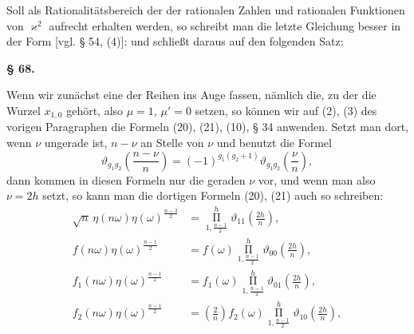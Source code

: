 
Soll als Rationalitätsbereich der der rationalen Zahlen und rationalen Funktionen von $\varkappa^2$ aufrecht erhalten werden, so schreibt man die letzte Gleichung besser in der Form [vgl. § 54, (4)]:
und schließt daraus auf den folgenden Satz:


\begin{center}
\textbf{§ 68.} \textbf{}
\end{center}

Wenn wir zunächst eine der Reihen ins Auge fassen, nämlich die, zu der die Wurzel $x_{1,0}$ gehört, also $\mu = 1$, $\mu' = 0$ setzen, so können wir auf (2), (3) des vorigen Paragraphen die Formeln (20), (21), (10), § 34 anwenden. Setzt man dort, wenn $\nu$ ungerade ist, $n - \nu$ an Stelle von $\nu$ und benutzt die Formel
\[
\vartheta_{g_1g_2}\left(\frac{n-\nu}{n}\right) = (-1)^{g_1(g_2+1)}\vartheta_{g_1g_2}\left(\frac{\nu}{n}\right),
\]
dann kommen in diesen Formeln nur die geraden $\nu$ vor, und wenn man also $\nu = 2h$ setzt, so kann man die dortigen Formeln (20), (21) auch so schreiben:
\[
\begin{aligned}
\sqrt{n}\,\eta(n\omega)\eta(\omega)^{\frac{n-3}{2}} &= \mathop{\Pi}\limits_{1,\frac{n-1}{2}}^{h}\vartheta_{11}\!\left(\frac{2h}{n}\right),\\
f(n\omega)\eta(\omega)^{\frac{n-1}{2}} &= f(\omega)\mathop{\Pi}\limits_{1,\frac{n-1}{2}}^{h}\vartheta_{00}\!\left(\frac{2h}{n}\right),\\
f_1(n\omega)\eta(\omega)^{\frac{n-1}{2}} &= f_1(\omega)\mathop{\Pi}\limits_{1,\frac{n-1}{2}}^{h}\vartheta_{01}\!\left(\frac{2h}{n}\right),\\
f_2(n\omega)\eta(\omega)^{\frac{n-1}{2}} &= \left(\frac{2}{n}\right)f_2(\omega)\mathop{\Pi}\limits_{1,\frac{n-1}{2}}^{h}\vartheta_{10}\!\left(\frac{2h}{n}\right),
\end{aligned}
\]
